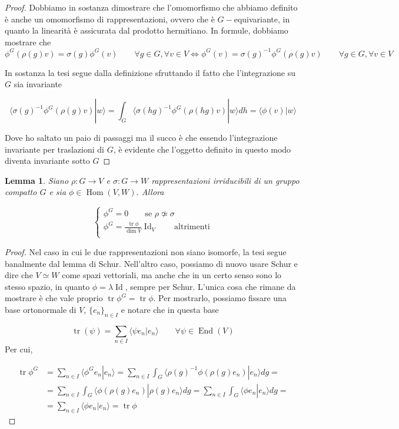 \documentclass[11pt]{article}
\theoremstyle{plain}
\newtheorem{lemma}[thm]{Lemma}
\theoremstyle{definition}
\theoremstyle{remark}
\newcommand{\dsum}{\displaystyle\sum}
\newcommand{\dint}{\displaystyle\int}
\DeclareMathOperator{\tr}{tr}
\DeclareMathOperator{\Hom}{Hom}
\DeclareMathOperator{\End}{End}
\DeclareMathOperator{\Id}{Id}
\DeclareMathOperator{\iso}{\simeq}
\DeclareMathOperator{\noniso}{\not\simeq}
\begin{document}
 \begin{proof}
   Dobbiamo in sostanza dimostrare che l'omomorfismo che abbiamo definito è anche un omomorfismo di rappresentazioni, ovvero che è $G-$equivariante, in quanto la linearità è assicurata dal prodotto hermitiano. In formule, dobbiamo mostrare che
   \[ \phi^G (\rho(g) v) = \sigma(g) \phi^G(v) \qquad \forall g \in G, \forall v \in V \Leftrightarrow \phi^G(v) = \sigma(g) ^{-1} \phi^G(\rho(g) v) \qquad \forall g \in G, \forall v \in V \]

   In sostanza la tesi segue dalla definizione sfruttando il fatto che l'integrazione su $G$ sia invariante


   \[ \langle \sigma(g) ^{-1} \phi^G(\rho(g) v) | w \rangle  = \dint_G \langle \sigma(hg) ^{-1} \phi^G(\rho(hg) v) | w \rangle dh = \langle \phi(v) | w \rangle\]

   Dove ho saltato un paio di passaggi ma il succo è che essendo l'integrazione invariante per traslazioni di $G$, è evidente che l'oggetto definito in questo modo diventa invariante sotto $G$
 \end{proof}

 \begin{lemma}
   Siano $\rho: G \to V$ e $\sigma: G \to W$ rappresentazioni irriducibili di un gruppo compatto $G$ e sia $\phi \in \Hom(V, W)$. Allora

   \[
   \begin{cases}
     \phi^G = 0 \qquad \text{se } \rho \noniso \sigma \\
     \phi^G = \frac{\tr \phi}{\dim V}\Id_V \qquad \text{altrimenti} \\
   \end{cases}
   \]

 \end{lemma}

 \begin{proof}
   Nel caso in cui le due rappresentazioni non siano isomorfe, la tesi segue banalmente dal lemma di Schur. Nell'altro caso, possiamo di nuovo usare Schur e dire che $V \iso W$ come spazi vettoriali, ma anche che in un certo senso sono lo stesso spazio, in quanto $\phi = \lambda \Id$, sempre per Schur. L'unica cosa che rimane da mostrare è che vale proprio $\tr \phi^G = \tr \phi$. Per mostrarlo, possiamo fissare una base ortonormale di $V$, $\{ e_n\}_{n\in I}$ e notare che in questa base

   \[ \tr(\psi) = \dsum_{n \in I}\langle \psi e_n | e_n \rangle \qquad \forall \psi \in \End(V)\]
   Per cui,

   \begin{align*} \tr \phi^G &= \dsum_{n \in I}\langle \phi^G e_n | e_n \rangle = \dsum_{n \in I} \dint_G \langle \rho(g)^{-1} \phi(\rho(g) e_n) | e_n \rangle dg = \\
     &= \dsum_{n \in I}\dint_G \langle \phi(\rho(g) e_n) | \rho(g) e_n \rangle  dg = \dsum_{n \in I} \dint_G \langle \phi e_n |  e_n \rangle dg = \\
     &= \dsum_{n\in I} \langle \phi e_n | e_n \rangle = \tr \phi
   \end{align*}


 \end{proof}
\end{document}
